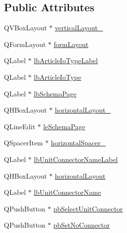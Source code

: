 \subsection*{Public Attributes}
\begin{DoxyCompactItemize}
\item 
Q\-V\-Box\-Layout $\ast$ \hyperlink{class_ui__mdt_cl_unit_connection_dialog_a31fda17e7cfe22d3702872856200633a}{vertical\-Layout\-\_}
\item 
Q\-Form\-Layout $\ast$ \hyperlink{class_ui__mdt_cl_unit_connection_dialog_aa5bed80735c5d7290ad926c4a6f8cda7}{form\-Layout}
\item 
Q\-Label $\ast$ \hyperlink{class_ui__mdt_cl_unit_connection_dialog_ad6fb4a3140d3e5e0307b6e19384c8cac}{lb\-Article\-Io\-Type\-Label}
\item 
Q\-Label $\ast$ \hyperlink{class_ui__mdt_cl_unit_connection_dialog_a87fe908cb5fef02efed381f5f4ddb42a}{lb\-Article\-Io\-Type}
\item 
Q\-Label $\ast$ \hyperlink{class_ui__mdt_cl_unit_connection_dialog_a5d8f668f9a3b9ace171bda47c4e97ea4}{lb\-Schema\-Page}
\item 
Q\-H\-Box\-Layout $\ast$ \hyperlink{class_ui__mdt_cl_unit_connection_dialog_aa51157504213b711434ca512a8c51c36}{horizontal\-Layout\-\_}
\item 
Q\-Line\-Edit $\ast$ \hyperlink{class_ui__mdt_cl_unit_connection_dialog_adb2ea9dde20a9d7769c7741ca439511b}{le\-Schema\-Page}
\item 
Q\-Spacer\-Item $\ast$ \hyperlink{class_ui__mdt_cl_unit_connection_dialog_a7762bb38617183a944b162164939b47c}{horizontal\-Spacer\-\_}
\item 
Q\-Label $\ast$ \hyperlink{class_ui__mdt_cl_unit_connection_dialog_ae54eb8fe077d9ec14674dc160f0c64d8}{lb\-Unit\-Connector\-Name\-Label}
\item 
Q\-H\-Box\-Layout $\ast$ \hyperlink{class_ui__mdt_cl_unit_connection_dialog_a2768de641bcfd7b51708846446f53839}{horizontal\-Layout}
\item 
Q\-Label $\ast$ \hyperlink{class_ui__mdt_cl_unit_connection_dialog_a576cf4a2577dde1712e3f465eda515b7}{lb\-Unit\-Connector\-Name}
\item 
Q\-Push\-Button $\ast$ \hyperlink{class_ui__mdt_cl_unit_connection_dialog_a61b49b8b83d523222ee29f4d92de184f}{pb\-Select\-Unit\-Connector}
\item 
Q\-Push\-Button $\ast$ \hyperlink{class_ui__mdt_cl_unit_connection_dialog_a6aed879ab8292d13e82f8d563ff38200}{pb\-Set\-No\-Connector}
\item 

\end{DoxyCompactItemize}
